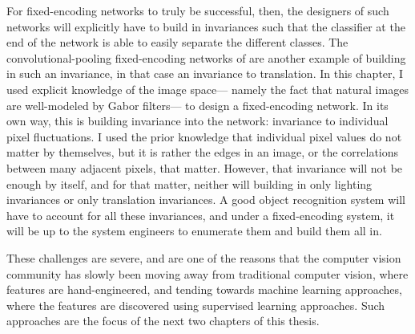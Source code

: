 For fixed-encoding networks to truly be successful, then,
the designers of such networks will explicitly have to build in invariances
such that the classifier at the end of the network
is able to easily separate the different classes.
The convolutional-pooling fixed-encoding networks of \textcite{McDonnell2015a}
are another example of building in such an invariance,
in that case an invariance to translation.
In this chapter, I used explicit knowledge of the image space---%
namely the fact that natural images are well-modeled by Gabor filters---%
to design a fixed-encoding network.
In its own way, this is building invariance into the network:
invariance to individual pixel fluctuations.
I used the prior knowledge that individual pixel values do not matter by themselves,
but it is rather the edges in an image, or the correlations between many adjacent pixels,
that matter.
However, that invariance will not be enough by itself,
and for that matter, neither will building in only lighting invariances
or only translation invariances.
A good object recognition system will have to account for all these invariances,
and under a fixed-encoding system,
it will be up to the system engineers to enumerate them and build them all in.

These challenges are severe,
and are one of the reasons that the computer vision community
has slowly been moving away from traditional computer vision,
where features are hand-engineered,
and tending towards machine learning approaches,
where the features are discovered using supervised learning approaches.
Such approaches are the focus of the next two chapters of this thesis.

